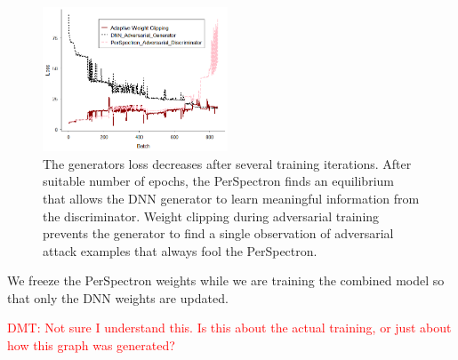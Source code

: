 \begin{figure}[ht!] 
\centering
\includegraphics[width=0.49\textwidth]{PerSpectron-Micro2020-camera-R/img/Loss2.png}
\vspace*{-4mm}
\caption{The generators loss decreases after several training iterations. After suitable number of epochs, the PerSpectron finds an equilibrium that allows the DNN generator to learn meaningful information from the discriminator. Weight clipping during adversarial training prevents the generator to find a single observation of adversarial attack examples that always fool the PerSpectron.  }
 
\label{fig:sature}
\end{figure}






We freeze the PerSpectron weights while we are training the combined model so that only the DNN weights are updated. 

\textcolor{red}{DMT: Not sure I understand this.  Is this about the actual training, or just about how
this graph was generated?}